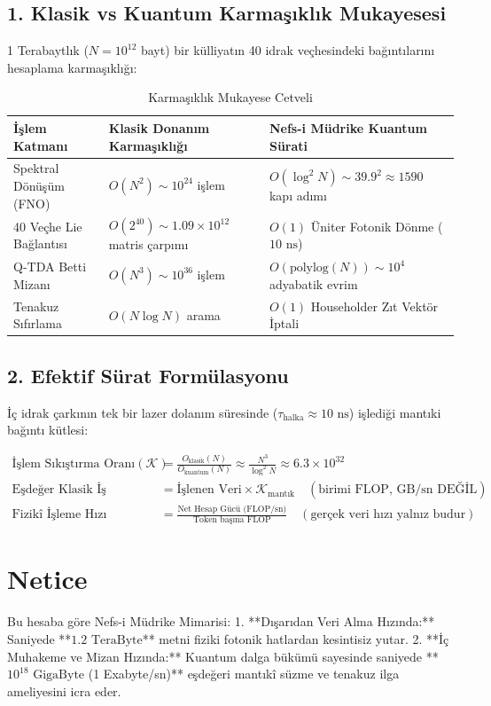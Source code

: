 \documentclass[11pt, a4paper]{article}
\begin{document}
\subsection{1. Klasik vs Kuantum Karmaşıklık Mukayesesi}
1 Terabaytlık ($N = 10^{12}$ bayt) bir külliyatın 40 idrak veçhesindeki bağıntılarını hesaplama karmaşıklığı:

\begin{table}[htbp]
\centering
\small
\begin{tabular}{@{}lll@{}}
\toprule
\textbf{İşlem Katmanı} & \textbf{Klasik Donanım Karmaşıklığı} & \textbf{Nefs-i Müdrike Kuantum Sürati} \\ \midrule
Spektral Dönüşüm (FNO) & $O(N^2) \sim 10^{24}$ işlem & $O(\log^2 N) \sim 39.9^2 \approx 1590$ kapı adımı \\
40 Veçhe Lie Bağlantısı & $O(2^{40}) \sim 1.09 \times 10^{12}$ matris çarpımı & $O(1)$ Üniter Fotonik Dönme ($10 \text{ ns}$) \\
Q-TDA Betti Mizanı & $O(N^3) \sim 10^{36}$ işlem & $O(\text{polylog}(N)) \sim 10^4$ adyabatik evrim \\
Tenakuz Sıfırlama & $O(N \log N)$ arama & $O(1)$ Householder Zıt Vektör İptali \\ \bottomrule
\end{tabular}
\caption{Karmaşıklık Mukayese Cetveli}
\end{table}

\subsection{2. Efektif Sürat Formülasyonu}
İç idrak çarkının tek bir lazer dolanım süresinde ($\tau_{\text{halka}} \approx 10 \text{ ns}$) işlediği mantıki bağıntı kütlesi:

\begin{align}
\text{İşlem Sıkıştırma Oranı} (\mathcal{K}) &= \frac{O_{\text{klasik}}(N)}{O_{\text{kuantum}}(N)} \approx \frac{N^3}{\log^2 N} \approx 6.3 \times 10^{32} \\
\text{Eşdeğer Klasik İş} &= \text{İşlenen Veri} \times \mathcal{K}_{\text{mantık}} \quad (\text{birimi FLOP, GB/sn DEĞİL}) \\ \text{Fizikî İşleme Hızı} &= \frac{\text{Net Hesap Gücü (FLOP/sn)}}{\text{Token başına FLOP}} \quad (\text{gerçek veri hızı yalnız budur})
\end{align}

\section{Netice}

Bu hesaba göre Nefs-i Müdrike Mimarisi:
1. **Dışarıdan Veri Alma Hızında:** Saniyede **$1.2 \text{ TeraByte}$** metni fiziki fotonik hatlardan kesintisiz yutar.
2. **İç Muhakeme ve Mizan Hızında:** Kuantum dalga bükümü sayesinde saniyede **$10^{18} \text{ GigaByte}$ (1 Exabyte/sn)** eşdeğeri mantıkî süzme ve tenakuz ilga ameliyesini icra eder.
\end{document}
